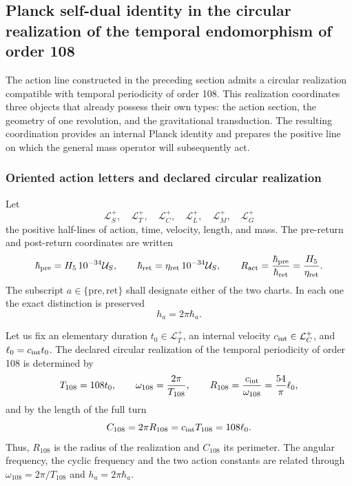 \subsection[Planck's Self-Dual Identity on the Periodicity of Order 108]{Planck self-dual identity in the circular realization of the temporal endomorphism of order 108}
\label{sec:identidad-autodual-planck-ct108-rev3}

The action line constructed in the preceding section admits a
circular realization compatible with temporal periodicity of order 108.
This realization coordinates three objects that already possess their own types: the
action section, the geometry of one revolution, and the gravitational
transduction. The resulting coordination provides an internal Planck
identity and prepares the positive line on which the general mass
operator will subsequently act.

\subsubsection{Oriented action letters and declared circular realization}

Let
\[
 \mathcal L_S^+,\quad \mathcal L_T^+,\quad \mathcal L_C^+,
 \quad \mathcal L_L^+,\quad \mathcal L_M^+,\quad \mathcal L_G^+
\]
the positive half-lines of action, time, velocity, length, and mass.
The pre-return and post-return coordinates are written
\begin{equation}
 \hbar_{\rm pre}=H_5\,10^{-34}\mathcal U_S,
 \qquad
 \hbar_{\rm ret}=\eta_{\rm ret}\,10^{-34}\mathcal U_S,
 \qquad
 R_{\rm act}=\frac{\hbar_{\rm pre}}{\hbar_{\rm ret}}
 =\frac{H_5}{\eta_{\rm ret}}.
 \label{eq:planck-ct108-cartas-pre-ret-rev3}
\end{equation}
The subscript \(a\in\{\mathrm{pre},\mathrm{ret}\}\) shall designate either
of the two charts. In each one the exact distinction is preserved
\begin{equation}
 h_a=2\pi\hbar_a .
 \label{eq:planck-ct108-h-hbar-rev3}
\end{equation}

Let us fix an elementary duration \(t_0\in\mathcal L_T^+\), an internal
velocity \(c_{\rm int}\in\mathcal L_C^+\), and
\(\ell_0=c_{\rm int}t_0\). The declared circular realization of the
temporal periodicity of order 108 is determined by
\begin{equation}
 T_{108}=108t_0,
 \qquad
 \omega_{108}=\frac{2\pi}{T_{108}},
 \qquad
 R_{108}=\frac{c_{\rm int}}{\omega_{108}}
 =\frac{54}{\pi}\ell_0,
 \label{eq:planck-ct108-realizacion-circular-rev3}
\end{equation}
and by the length of the full turn
\begin{equation}
 C_{108}=2\pi R_{108}=c_{\rm int}T_{108}=108\ell_0.
 \label{eq:planck-ct108-perimetro-rev3}
\end{equation}
Thus, \(R_{108}\) is the radius of the realization and \(C_{108}\) its
perimeter. The angular frequency, the cyclic frequency and the two
action constants are related through
\(\omega_{108}=2\pi/T_{108}\) and \(h_a=2\pi\hbar_a\).

